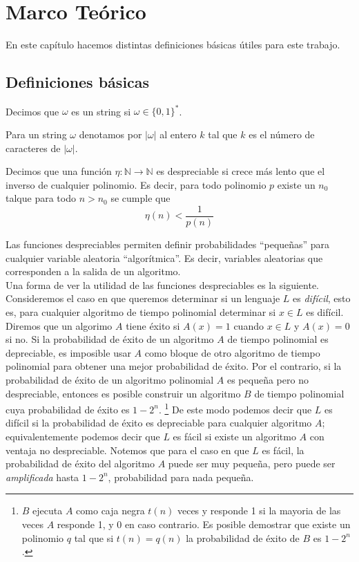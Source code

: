 \chapter{Marco Teórico}

En este capítulo hacemos distintas definiciones básicas útiles
para este trabajo.

\section{Definiciones básicas}

\begin{definicion}[String]
Decimos que $\omega$ es un string si $\omega \in \{0,1\}^*$.
\end{definicion}

\begin{definicion}
Para un string $\omega$ denotamos por $|\omega|$ al entero $k$
tal que $k$ es el número de caracteres de $|\omega|$.
\end{definicion}

\begin{definicion}
Decimos que una función $\eta: \mathbb{N} \to \mathbb{N}$ es despreciable
si crece más lento que el inverso de cualquier polinomio. Es decir, para
todo polinomio $p$ existe
un $n_0$ talque para todo $n > n_0$ se cumple que
$$\eta(n) < \frac{1}{p(n)}$$
\end{definicion}
Las funciones despreciables permiten definir probabilidades ``pequeñas'' para cualquier
variable aleatoria ``algorítmica''. Es decir, variables aleatorias que corresponden a la
salida de un algoritmo.\\
Una forma de ver la utilidad de las funciones despreciables es la siguiente. Consideremos
el caso en que queremos determinar si un lenguaje $L$ es \textit{difícil}, esto es, para
cualquier algoritmo de tiempo polinomial determinar si $x \in L$ es difícil.
Diremos que un algorimo $A$ tiene éxito si $A(x) = 1$ cuando $x \in L$ y $A(x) = 0$
si no.
Si la probabilidad de éxito de un algoritmo $A$ de tiempo polinomial es depreciable, es imposible usar
$A$ como bloque de otro algoritmo de tiempo polinomial para obtener una mejor probabilidad de éxito.
Por el contrario, si la probabilidad de éxito de un algoritmo polinomial $A$ es pequeña pero no despreciable,
entonces es posible construir un algoritmo $B$ de tiempo polinomial cuya probabilidad de éxito es
$1-2^n$. 
\footnote{$B$ ejecuta $A$ como caja negra $t(n)$ veces y responde 1 si la mayoria
de las veces $A$ responde 1, y 0 en caso contrario. Es posible demostrar que existe un polinomio $q$ tal
que si $t(n) = q(n)$ la probabilidad de éxito de $B$ es $1-2^n$.}
De este modo podemos decir que $L$ es difícil si la probabilidad de éxito es depreciable para cualquier
algoritmo $A$; equivalentemente podemos decir que $L$ es fácil si existe un algoritmo $A$ con ventaja no
despreciable. Notemos que para el caso en que $L$ es fácil, la probabilidad de éxito del algoritmo $A$
puede ser muy pequeña, pero puede ser \textit{amplificada} hasta $1-2^n$, probabilidad para nada pequeña.


